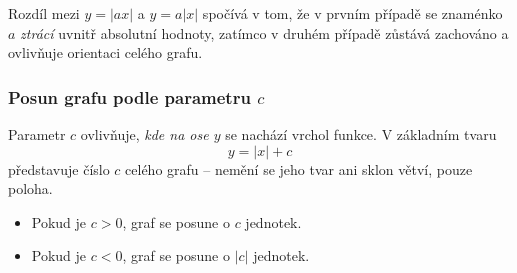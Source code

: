 \documentclass[12pt,a4paper]{article}
\begin{document}
\begin{notebox}
Rozdíl mezi $y = |a x|$ a $y = a|x|$ spočívá v tom, že v prvním případě se 
znaménko $a$ \textit{ztrácí} uvnitř absolutní hodnoty,  
zatímco v druhém případě zůstává zachováno a ovlivňuje orientaci celého grafu.
\end{notebox}




\subsubsection*{Posun grafu podle parametru $c$}

Parametr $c$ ovlivňuje, \textit{kde na ose $y$} se nachází vrchol funkce.  
V základním tvaru
\[
y = |x| + c
\]
představuje číslo $c$  celého grafu – nemění se jeho tvar ani sklon větví, pouze poloha.

\begin{itemize}
    \item Pokud je $c > 0$, graf se posune  o $c$ jednotek.  
    \item Pokud je $c < 0$, graf se posune  o $|c|$ jednotek.  
\end{itemize}
\end{document}
